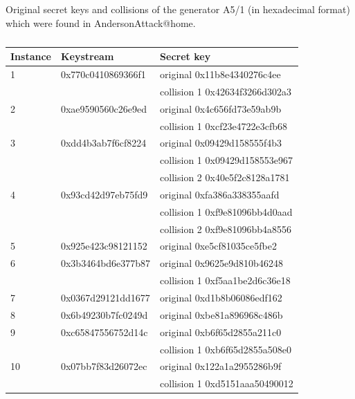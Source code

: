 \documentclass[runningheads,a4paper]{llncs}[2015/06/24]
\begin{document}
\begin{table} 
\caption{} 
\label{tab:keys} Original secret keys and collisions of the
	generator A5/1 (in hexadecimal format) which were found in
	AndersonAttack@home.
	\begin {center} 
		\begin{tabular}
			{| l | l | l |}
			\hline
			Instance & Keystream & Secret key \\ \hline
			1 & 0x770c0410869366f1 & original 0x11b8e4340276c4ee \\
			  &                    & collision 1 0x42634f3266d302a3 \\ \hline
			2 & 0xae9590560c26e9ed & original 0x4c656fd73e59ab9b \\
			  &                    & collision 1 0xcf23e4722e3cfb68 \\ \hline
			3 & 0xdd4b3ab7f6cf8224 & original 0x09429d158555f4b3 \\
			  &                    & collision 1 0x09429d158553e967 \\
			  &                    & collision 2 0x40e5f2c8128a1781 \\ \hline
			4 & 0x93cd42d97eb75fd9 & original 0xfa386a338355aafd \\
			  &                    & collision 1 0xf9e81096bb4d0aad \\ 
			  &                    & collision 2 0xf9e81096bb4a8556 \\ \hline
			5 & 0x925e423c98121152 & original 0xe5cf81035ce5fbe2 \\ \hline
			6 & 0x3b3464bd6e377b87 & original 0x9625e9d810b46248 \\
			  &                    & collision 1 0xf5aa1be2d6c36e18 \\ \hline
			7 & 0x0367d29121dd1677 & original 0xd1b8b06086edf162 \\ \hline
			8 & 0x6b49230b7fc0249d & original 0xbe81a896968c486b \\ \hline
			9 & 0xc65847556752d14c & original 0xb6f65d2855a211c0 \\ 
			  &                    & collision 1 0xb6f65d2855a508e0 \\ \hline
			10& 0x07bb7f83d26072ec & original 0x122a1a2955286b9f \\ 
			  &                    & collision 1 0xd5151aaa50490012 \\ \hline
		\end{tabular}
	\end {center}
\end{table}
\end{document}

